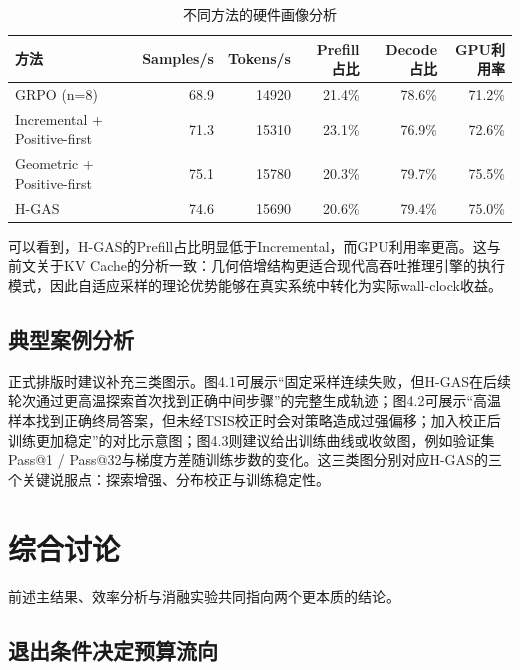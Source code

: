 \begin{table}[htbp]
    \centering
    \caption{不同方法的硬件画像分析}\label{tab:exp_hardware_profile_table}
    \small
    \setlength{\tabcolsep}{3.0pt}
    \renewcommand{\arraystretch}{1.15}
    \begin{tabular}{|l|r|r|r|r|r|}
    \hline
    \textbf{方法} & \textbf{Samples/s} & \textbf{Tokens/s} & \textbf{Prefill占比} & \textbf{Decode占比} & \textbf{GPU利用率} \\
    \hline
    GRPO (n=8)                   & 68.9 & 14920 & 21.4\% & 78.6\% & 71.2\% \\
    Incremental + Positive-first & 71.3 & 15310 & 23.1\% & 76.9\% & 72.6\% \\
    Geometric + Positive-first   & 75.1 & 15780 & 20.3\% & 79.7\% & 75.5\% \\
    H-GAS                        & 74.6 & 15690 & 20.6\% & 79.4\% & 75.0\% \\
    \hline
    \end{tabular}
\end{table}

可以看到，H-GAS的Prefill占比明显低于Incremental，而GPU利用率更高。这与前文关于KV Cache的分析一致：几何倍增结构更适合现代高吞吐推理引擎的执行模式，因此自适应采样的理论优势能够在真实系统中转化为实际wall-clock收益。

\subsection{典型案例分析}
\label{subsec:exp_case_study}

正式排版时建议补充三类图示。图4.1可展示“固定采样连续失败，但H-GAS在后续轮次通过更高温探索首次找到正确中间步骤”的完整生成轨迹；图4.2可展示“高温样本找到正确终局答案，但未经TSIS校正时会对策略造成过强偏移；加入校正后训练更加稳定”的对比示意图；图4.3则建议给出训练曲线或收敛图，例如验证集Pass@1 / Pass@32与梯度方差随训练步数的变化。这三类图分别对应H-GAS的三个关键说服点：探索增强、分布校正与训练稳定性。

\section{综合讨论}
\label{sec:exp_discussion}

前述主结果、效率分析与消融实验共同指向两个更本质的结论。

\subsection{退出条件决定预算流向}
\label{subsec:exp_discussion_exit}


